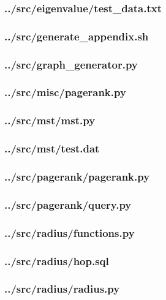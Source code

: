 \subsubsection{../src/eigenvalue/test\_data.txt}

\subsubsection{../src/generate\_appendix.sh}

\subsubsection{../src/graph\_generator.py}

\subsubsection{../src/misc/pagerank.py}

\subsubsection{../src/mst/mst.py}

\subsubsection{../src/mst/test.dat}

\subsubsection{../src/pagerank/pagerank.py}

\subsubsection{../src/pagerank/query.py}

\subsubsection{../src/radius/functions.py}

\subsubsection{../src/radius/hop.sql}

\subsubsection{../src/radius/radius.py}

